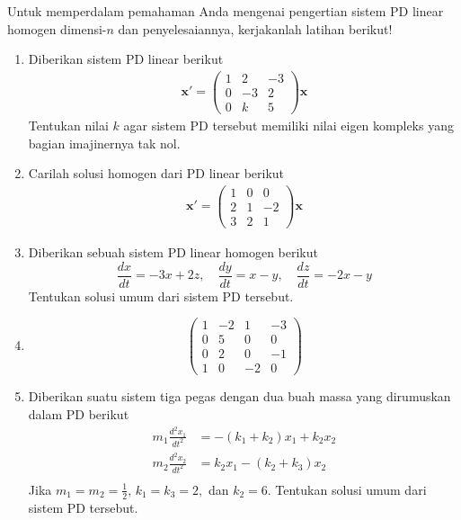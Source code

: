 \documentclass[a4paper]{article}
\theoremstyle{definisi}
\numberwithin{equation}{section}
\begin{document}
  \newpage
  \noindent Untuk memperdalam pemahaman Anda mengenai pengertian sistem PD linear homogen dimensi-$n$ dan penyelesaiannya, kerjakanlah latihan berikut!
  \begin{enumerate}
    \item Diberikan sistem PD linear berikut
    \begin{align*}
      \mathbf{x'} = \begin{pmatrix}
        1 & 2 & -3\\
        0 & -3 & 2\\
        0 & k & 5
      \end{pmatrix}\mathbf{x}
    \end{align*}
    Tentukan nilai $k$ agar sistem PD tersebut memiliki nilai eigen kompleks yang bagian imajinernya tak nol.
    \item Carilah solusi homogen dari PD linear berikut
    \begin{align*}
      \mathbf{x'} = \begin{pmatrix}
        1 & 0 & 0\\
        2 & 1 & -2\\
        3 & 2 & 1
      \end{pmatrix}\mathbf{x}
    \end{align*}

    \item Diberikan sebuah sistem PD linear homogen berikut
    \begin{equation*}
        \frac{dx}{dt}=-3x+2z,\quad
        \frac{dy}{dt}=x-y,\quad
        \frac{dz}{dt}=-2x-y
    \end{equation*}
    Tentukan solusi umum dari sistem PD tersebut.
    
    \item 
    \[\begin{pmatrix}
      1 & -2 & 1 & -3\\
      0 & 5 & 0 & 0\\
      0 & 2 & 0 & -1\\
      1 & 0 & -2 & 0
    \end{pmatrix}\]
    
    \item Diberikan suatu sistem tiga pegas dengan dua buah massa yang dirumuskan dalam PD berikut
    \begin{equation*}
      \begin{split}
        m_1\frac{d^2x_1}{dt^2}&=-(k_1+k_2)x_1+k_2x_2\\
        m_2\frac{d^2x_2}{dt^2}&=k_2x_1-(k_2+k_3)x_2\\
      \end{split}
    \end{equation*}
    Jika $m_1=m_2=\frac{1}{2},\,k_1=k_3=2,$ dan $k_2=6$. Tentukan solusi umum dari sistem PD tersebut.
  \end{enumerate}
\end{document}
